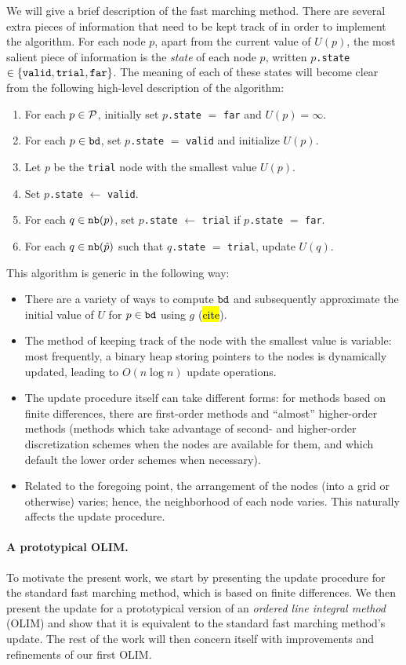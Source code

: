 \documentclass[eikonal.tex]{subfiles}
\begin{document}
We will give a brief description of the fast marching method. There
are several extra pieces of information that need to be kept track of
in order to implement the algorithm. For each node $p$, apart from the
current value of $U(p)$, the most salient piece of information is the
\emph{state} of each node $p$, written $p$\texttt{.state}
$\in \left\{\texttt{valid}, \texttt{trial}, \texttt{far}\right\}$. The meaning
of each of these states will become clear from the following
high-level description of the algorithm:
\begin{enumerate}
\item For each $p \in \mathcal{P}$, initially set $p$\texttt{.state} $=$
  \texttt{far} and $U(p) = \infty$.
\item For each $p \in \texttt{bd}$, set $p$\texttt{.state} $=$
  \texttt{valid} and initialize $U(p)$.
\item Let $p$ be the \texttt{trial} node with the smallest value
  $U(p)$.
\item Set $p$\texttt{.state} $\gets$ \texttt{valid}.
\item For each $q \in \texttt{nb}(p)$, set $p$\texttt{.state} $\gets$ \texttt{trial} if $p$\texttt{.state} $=$ \texttt{far}.
\item For each $q \in \texttt{nb}(\hat{p})$ such that $q$\texttt{.state} $=$
  \texttt{trial}, update $U(q)$.
\end{enumerate}
This algorithm is generic in the following way:
\begin{itemize}
\item There are a variety of ways to compute $\texttt{bd}$ and
  subsequently approximate the initial value of $U$ for
  $p \in \texttt{bd}$ using $g$ (\hl{cite}).
\item The method of keeping track of the node with the smallest value
  is variable: most frequently, a binary heap storing pointers to the
  nodes is dynamically updated, leading to $O(n \log n)$ update
  operations.
\item The update procedure itself can take different forms: for
  methods based on finite differences, there are first-order methods
  and ``almost'' higher-order methods (methods which take advantage of
  second- and higher-order discretization schemes when the nodes are
  available for them, and which default the lower order schemes when
  necessary).
\item Related to the foregoing point, the arrangement of the nodes
  (into a grid or otherwise) varies; hence, the neighborhood of each
  node varies. This naturally affects the update procedure.
\end{itemize}

\paragraph{A prototypical OLIM.} To motivate the present work, we
start by presenting the update procedure for the standard fast
marching method, which is based on finite differences. We then present
the update for a prototypical version of an \emph{ordered line
  integral method} (OLIM) and show that it is equivalent to the
standard fast marching method's update. The rest of the work will then
concern itself with improvements and refinements of our first OLIM.
\end{document}
